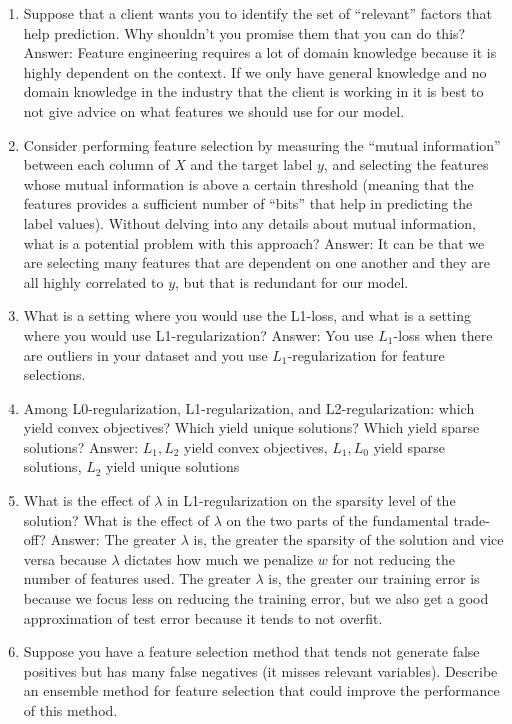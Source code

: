 \documentclass{article}
\def\gre#1{{\color{gre}#1}}
\def\ans#1{\gre{Answer: #1}}{}
\def\enum#1{\begin{enumerate}#1\end{enumerate}}
\begin{document}
\enum{
\item Suppose that a client wants you to identify the set of ``relevant'' factors that help prediction. Why shouldn't you promise them that you can do this?
\ans{Feature engineering requires a lot of domain knowledge because it is highly dependent on the context. If we only have general knowledge and no domain knowledge in the industry that the client is working in it is best to not give advice on what features we should use for our model.}
\item Consider performing feature selection by measuring the ``mutual information'' between each column of $X$ and the target label $y$, and selecting the features whose mutual information is above a certain threshold (meaning that the features provides a sufficient number of ``bits'' that help in predicting the label values). Without delving into any details about mutual information, what is a potential problem with this approach?
\ans{It can be that we are selecting many features that are dependent on one another and they are all highly correlated to $y$, but that is redundant for our model.}
\item What is a setting where you would use the L1-loss, and what is a setting where you would use L1-regularization?
\ans{You use $L_1$-loss when there are outliers in your dataset and you use $L_1$-regularization for feature selections.}
\item Among L0-regularization, L1-regularization, and L2-regularization: which yield convex objectives? Which yield unique solutions? Which yield sparse solutions?
\ans{$L_1, L_2$ yield convex objectives, $L_1, L_0$ yield sparse solutions, $L_2$ yield unique solutions}
\item What is the effect of $\lambda$ in L1-regularization on the sparsity level of the solution? What is the effect of $\lambda$ on the two parts of the fundamental trade-off?
\ans{The greater $\lambda$ is, the greater the sparsity of the solution and vice versa because $\lambda$ dictates how much we penalize $w$ for not reducing the number of features used. The greater $\lambda$ is, the greater our training error is because we focus less on reducing the training error, but we also get a good approximation of test error because it tends to not overfit.}
\item Suppose you have a feature selection method that tends not generate false positives but has many false negatives (it misses relevant variables). Describe an ensemble method for feature selection that could improve the performance of this method.
}
\end{document}
